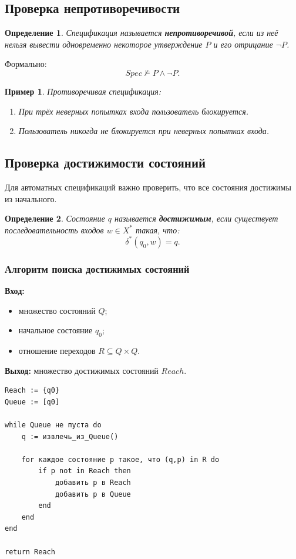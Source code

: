 \documentclass[12pt,a4paper]{article}
\newtheorem{definition}{Определение}
\newtheorem{example}{Пример}
\begin{document}
\subsection{Проверка непротиворечивости}

\begin{definition}
Спецификация называется \textbf{непротиворечивой}, если из неё нельзя вывести одновременно некоторое утверждение $P$ и его отрицание $\neg P$.
\end{definition}

Формально:
\[
    Spec \not\models P \land \neg P.
\]

\begin{example}
Противоречивая спецификация:
\begin{enumerate}
    \item При трёх неверных попытках входа пользователь блокируется.
    \item Пользователь никогда не блокируется при неверных попытках входа.
\end{enumerate}
\end{example}

\subsection{Проверка достижимости состояний}

Для автоматных спецификаций важно проверить, что все состояния достижимы из начального.

\begin{definition}
Состояние $q$ называется \textbf{достижимым}, если существует последовательность входов $w \in X^*$ такая, что:
\[
    \delta^*(q_0,w) = q.
\]
\end{definition}

\subsubsection{Алгоритм поиска достижимых состояний}

\textbf{Вход:}
\begin{itemize}
    \item множество состояний $Q$;
    \item начальное состояние $q_0$;
    \item отношение переходов $R \subseteq Q \times Q$.
\end{itemize}

\textbf{Выход:}
множество достижимых состояний $Reach$.

\begin{lstlisting}[style=pseudo]
Reach := {q0}
Queue := [q0]

while Queue не пуста do
    q := извлечь_из_Queue()

    for каждое состояние p такое, что (q,p) in R do
        if p not in Reach then
            добавить p в Reach
            добавить p в Queue
        end
    end
end

return Reach
\end{lstlisting}
\end{document}
